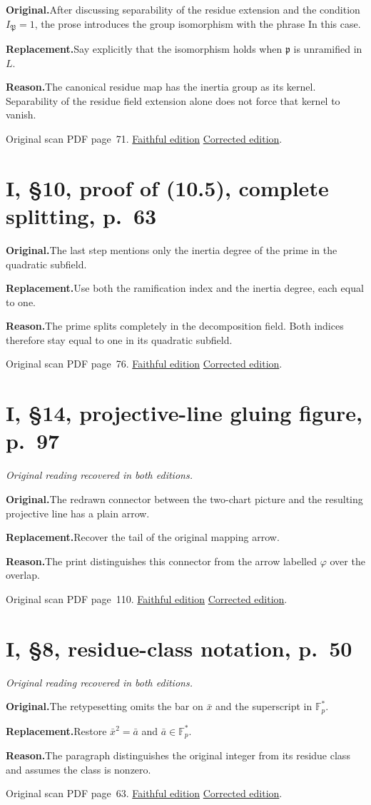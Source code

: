 \documentclass[11pt,a4paper]{article}
\newcommand{\original}{\par\smallskip\noindent\textbf{Original.}\enspace}
\newcommand{\replacement}{\par\smallskip\noindent\textbf{Replacement.}\enspace}
\newcommand{\reason}{\par\smallskip\noindent\textbf{Reason.}\enspace}
\newcommand{\editionlink}[3]{\href{#1\#errata.#2}{#3}}
\newcommand{\location}[2]{%
  \par\smallskip\noindent Original scan PDF page~#2.\enspace
  \editionlink{Neukirch_Faithful.pdf}{#1}{Faithful edition}
  \quad\editionlink{Neukirch_Corrected.pdf}{#1}{Corrected edition}.}
\begin{document}
\original After discussing separability of the residue extension and the condition $I_{\mathfrak P}=1$, the prose introduces the group isomorphism with the phrase In this case.
\replacement Say explicitly that the isomorphism holds when $\mathfrak p$ is unramified in $L$.
\reason The canonical residue map has the inertia group as its kernel. Separability of the residue field extension alone does not force that kernel to vanish.
\location{182}{71}

\setcounter{section}{182}
\section{I, \S10, proof of (10.5), complete splitting, p.~63}\label{errata:item:183}

\original The last step mentions only the inertia degree of the prime in the quadratic subfield.
\replacement Use both the ramification index and the inertia degree, each equal to one.
\reason The prime splits completely in the decomposition field. Both indices therefore stay equal to one in its quadratic subfield.
\location{183}{76}

\setcounter{section}{183}
\section{I, \S14, projective-line gluing figure, p.~97}\label{errata:item:184}
\noindent\emph{Original reading recovered in both editions.}\par
\original The redrawn connector between the two-chart picture and the resulting projective line has a plain arrow.
\replacement Recover the tail of the original mapping arrow.
\reason The print distinguishes this connector from the arrow labelled $\varphi$ over the overlap.
\location{184}{110}

\setcounter{section}{184}
\section{I, \S8, residue-class notation, p.~50}\label{errata:item:185}
\noindent\emph{Original reading recovered in both editions.}\par
\original The retypesetting omits the bar on $\bar x$ and the superscript in $\mathbb F_p^*$.
\replacement Restore $\bar x^2=\bar a$ and $\bar a\in\mathbb F_p^*$.
\reason The paragraph distinguishes the original integer from its residue class and assumes the class is nonzero.
\location{185}{63}

\setcounter{section}{185}
\end{document}

